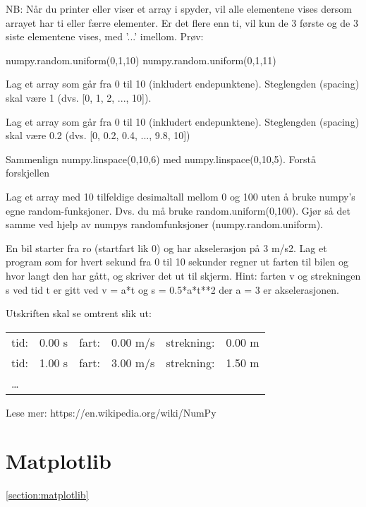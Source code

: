 NB: Når du printer eller viser et array i spyder, vil alle elementene vises dersom arrayet har ti eller færre elementer. Er det flere enn ti, vil kun de 3 første og de 3 siste elementene vises, med '...' imellom. Prøv:
\begin{usncodebox}
numpy.random.uniform(0,1,10)
numpy.random.uniform(0,1,11)
\end{usncodebox}

\begin{question}
Lag et array som går fra 0 til 10 (inkludert endepunktene). Steglengden (spacing) skal være 1  (dvs. [0, 1, 2, ..., 10]). 
\end{question}

\begin{question}
Lag et array som går fra 0 til 10 (inkludert endepunktene). Steglengden (spacing) skal være 0.2  (dvs. [0, 0.2, 0.4, ..., 9.8, 10])
\end{question}

\begin{question}
Sammenlign numpy.linspace(0,10,6) med numpy.linspace(0,10,5). Forstå forskjellen
\end{question}

\begin{question}
Lag et array med 10 tilfeldige desimaltall mellom 0 og 100 
uten å bruke numpy's egne random-funksjoner. 
Dvs. du må bruke random.uniform(0,100).
Gjør så det samme ved hjelp av numpys randomfunksjoner (numpy.random.uniform).
\end{question}

\begin{question}
En bil starter fra ro (startfart lik 0) og har akselerasjon på 3 m/s2. Lag et program som for hvert sekund fra 0 til 10 sekunder regner ut farten til bilen  og hvor langt den har gått, og skriver det ut til skjerm. Hint: farten v og strekningen s ved tid t er gitt ved v = a*t og s = 0.5*a*t**2 der a = 3 er akselerasjonen.

Utskriften skal se omtrent slik ut:
\begin{tabular}{l|r|l|r|l|r}
tid: & 0.00 s  &  fart: & 0.00 m/s &   strekning: &  0.00 m\\
tid: & 1.00 s  &  fart: & 3.00 m/s &   strekning: &  1.50 m\\
\ldots & & & & & 
\end{tabular}
\end{question}

Lese mer: https://en.wikipedia.org/wiki/NumPy

\section{Matplotlib}
\ref{section:matplotlib}

